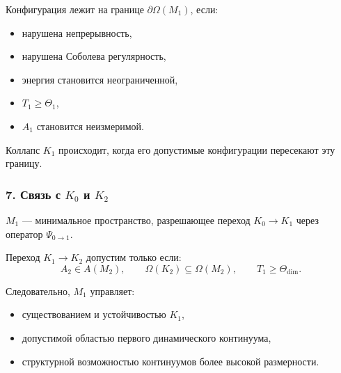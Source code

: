 Конфигурация лежит на границе $\partial\Omega(M_1)$, если:

\begin{itemize}
    \item нарушена непрерывность,
    \item нарушена Соболева регулярность,
    \item энергия становится неограниченной,
    \item $T_1 \ge \Theta_1$,
    \item $A_1$ становится неизмеримой.
\end{itemize}

Коллапс $K_1$ происходит, когда его допустимые конфигурации пересекают эту границу.

\subsubsection*{7. Связь с \texorpdfstring{$K_0$}{K_0} и \texorpdfstring{$K_2$}{K_2}}

$M_1$ — минимальное пространство, разрешающее переход $K_0 \to K_1$ через оператор
$\Psi_{0\to1}$.

Переход $K_1 \to K_2$ допустим только если:
\[
A_2 \in A(M_2),\qquad
\Omega(K_2) \subseteq \Omega(M_2),\qquad
T_1 \ge \Theta_{\text{dim}}.
\]

Следовательно, $M_1$ управляет:

\begin{itemize}
    \item существованием и устойчивостью $K_1$,
    \item допустимой областью первого динамического континуума,
    \item структурной возможностью континуумов более высокой размерности.
\end{itemize}
